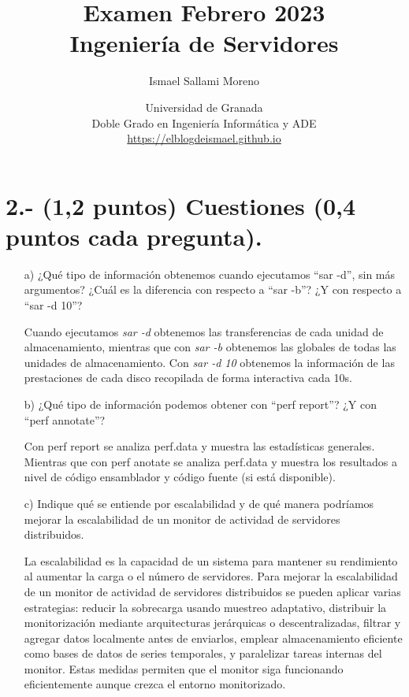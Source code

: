 \documentclass[a4paper,12pt]{article}
\title{\Huge Examen Febrero 2023\vspace{0.5cm} \\ \Large Ingeniería de Servidores}
\author{Ismael Sallami Moreno}
\date{\small Universidad de Granada\\ Doble Grado en Ingeniería Informática y ADE\\ \url{https://elblogdeismael.github.io}}
\begin{document}
\maketitle
\thispagestyle{fancy}

\vspace{1cm}

\section*{2.- (1,2 puntos) Cuestiones (0,4 puntos cada pregunta).}
\begin{enumerate}
    \item[a)] ¿Qué tipo de información obtenemos cuando ejecutamos ``sar -d'', sin más argumentos? ¿Cuál es la diferencia con respecto a ``sar -b''? ¿Y con respecto a ``sar -d 10''?
    
    Cuando ejecutamos \textit{sar -d} obtenemos las transferencias de cada unidad de almacenamiento, mientras que con \textit{sar -b} obtenemos las globales de todas las unidades de almacenamiento. Con \textit{sar -d 10} obtenemos la información de las prestaciones de cada disco recopilada de forma interactiva cada 10s.

    \item[b)] ¿Qué tipo de información podemos obtener con ``perf report''? ¿Y con ``perf annotate''?
    
    Con perf report se analiza perf.data y muestra las estadísticas generales. Mientras que con perf anotate se analiza perf.data y muestra los resultados a nivel de código ensamblador y código fuente (si está disponible).

    \item[c)] Indique qué se entiende por escalabilidad y de qué manera podríamos mejorar la escalabilidad de un monitor de actividad de servidores distribuidos.
    
    La escalabilidad es la capacidad de un sistema para mantener su rendimiento al aumentar la carga o el número de servidores. Para mejorar la escalabilidad de un monitor de actividad de servidores distribuidos se pueden aplicar varias estrategias: reducir la sobrecarga usando muestreo adaptativo, distribuir la monitorización mediante arquitecturas jerárquicas o descentralizadas, filtrar y agregar datos localmente antes de enviarlos, emplear almacenamiento eficiente como bases de datos de series temporales, y paralelizar tareas internas del monitor. Estas medidas permiten que el monitor siga funcionando eficientemente aunque crezca el entorno monitorizado.
\end{enumerate}
\end{document}
